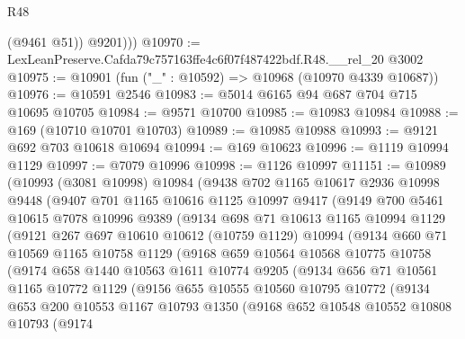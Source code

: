 \begin{lexlean}{R48}
\begin{coremodule}
            (@9461 @51))
          @9201)))
@10970 := LexLeanPreserve.Cafda79c757163ffe4c6f07f487422bdf.R48.__rel_20 @3002
@10975 := @10901 (fun ("_" : @10592) => @10968 (@10970 @4339 @10687))
@10976 := @10591 @2546
@10983 := @5014 @6165 @94 @687 @704 @715 @10695 @10705
@10984 := @9571 @10700
@10985 := @10983 @10984
@10988 := @169 (@10710 @10701 @10703)
@10989 := @10985 @10988
@10993 := @9121 @692 @703 @10618 @10694
@10994 := @169 @10623
@10996 := @1119 @10994 @1129
@10997 := @7079 @10996
@10998 := @1126 @10997
@11151 := @10989
    (@10993
      (@3081 @10998)
      @10984
      (@9438
        @702
        @1165
        @10617
        @2936
        @10998
        @9448
        (@9407
          @701
          @1165
          @10616
          @1125
          @10997
          @9417
          (@9149
            @700
            @5461
            @10615
            @7078
            @10996
            @9389
            (@9134
              @698
              @71
              @10613
              @1165
              @10994
              @1129
              (@9121
                @267
                @697
                @10610
                @10612
                (@10759 @1129)
                @10994
                (@9134
                  @660
                  @71
                  @10569
                  @1165
                  @10758
                  @1129
                  (@9168
                    @659
                    @10564
                    @10568
                    @10775
                    @10758
                    (@9174
                      @658
                      @1440
                      @10563
                      @1611
                      @10774
                      @9205
                      (@9134
                        @656
                        @71
                        @10561
                        @1165
                        @10772
                        @1129
                        (@9156
                          @655
                          @10555
                          @10560
                          @10795
                          @10772
                          (@9134
                            @653
                            @200
                            @10553
                            @1167
                            @10793
                            @1350
                            (@9168
                              @652
                              @10548
                              @10552
                              @10808
                              @10793
                              (@9174

\end{coremodule}
\end{lexlean}
